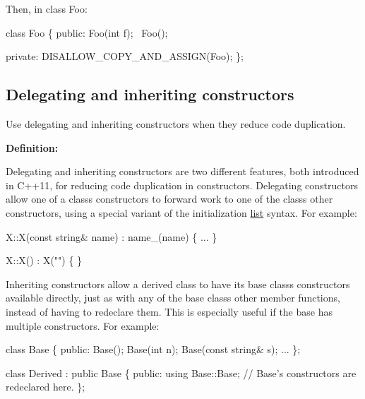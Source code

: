 Then, in class Foo\+:


\begin{DoxyCode}
\textcolor{keyword}{class }Foo
\{
\textcolor{keyword}{public}:
    Foo(\textcolor{keywordtype}{int} f);
    ~Foo();

\textcolor{keyword}{private}:
    DISALLOW\_COPY\_AND\_ASSIGN(Foo);
\};
\end{DoxyCode}


\subsection*{Delegating and inheriting constructors}

Use delegating and inheriting constructors when they reduce code duplication.

{\bfseries Definition\+:}

Delegating and inheriting constructors are two different features, both introduced in C++11, for reducing code duplication in constructors. Delegating constructors allow one of a class\textquotesingle{}s constructors to forward work to one of the class\textquotesingle{}s other constructors, using a special variant of the initialization \hyperlink{protocollist-p}{list} syntax. For example\+:


\begin{DoxyCode}
X::X(\textcolor{keyword}{const} \textcolor{keywordtype}{string}& name) : name\_(name) \{
  ...
\}

X::X() : X(\textcolor{stringliteral}{""}) \{ \}
\end{DoxyCode}


Inheriting constructors allow a derived class to have its base class\textquotesingle{}s constructors available directly, just as with any of the base class\textquotesingle{}s other member functions, instead of having to redeclare them. This is especially useful if the base has multiple constructors. For example\+:


\begin{DoxyCode}
\textcolor{keyword}{class }Base \{
\textcolor{keyword}{public}:
    Base();
    Base(\textcolor{keywordtype}{int} n);
    Base(\textcolor{keyword}{const} \textcolor{keywordtype}{string}& s);
    ...
\};

\textcolor{keyword}{class }Derived : \textcolor{keyword}{public} Base \{
\textcolor{keyword}{public}:
    \textcolor{keyword}{using} Base::Base;  \textcolor{comment}{// Base's constructors are redeclared here.}
\};
\end{DoxyCode}


